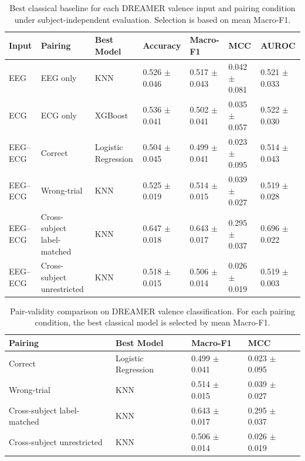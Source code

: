 \begin{table}[!t]
\centering
\caption{Best classical baseline for each DREAMER valence input and pairing condition under subject-independent evaluation. Selection is based on mean Macro-F1.}
\label{tab:dreamer_valence_best_classical}
\begin{tabular}{lllllll}
\toprule
Input & Pairing & Best Model & Accuracy & Macro-F1 & MCC & AUROC \\
\midrule
EEG & EEG only & KNN & 0.526 $\pm$ 0.046 & 0.517 $\pm$ 0.043 & 0.042 $\pm$ 0.081 & 0.521 $\pm$ 0.033 \\
ECG & ECG only & XGBoost & 0.536 $\pm$ 0.041 & 0.502 $\pm$ 0.041 & 0.035 $\pm$ 0.057 & 0.522 $\pm$ 0.030 \\
EEG--ECG & Correct & Logistic Regression & 0.504 $\pm$ 0.045 & 0.499 $\pm$ 0.041 & 0.023 $\pm$ 0.095 & 0.514 $\pm$ 0.043 \\
EEG--ECG & Wrong-trial & KNN & 0.525 $\pm$ 0.019 & 0.514 $\pm$ 0.015 & 0.039 $\pm$ 0.027 & 0.519 $\pm$ 0.028 \\
EEG--ECG & Cross-subject label-matched & KNN & 0.647 $\pm$ 0.018 & 0.643 $\pm$ 0.017 & 0.295 $\pm$ 0.037 & 0.696 $\pm$ 0.022 \\
EEG--ECG & Cross-subject unrestricted & KNN & 0.518 $\pm$ 0.015 & 0.506 $\pm$ 0.014 & 0.026 $\pm$ 0.019 & 0.519 $\pm$ 0.003 \\
\bottomrule
\end{tabular}
\end{table}

\begin{table}[!t]
\centering
\caption{Pair-validity comparison on DREAMER valence classification. For each pairing condition, the best classical model is selected by mean Macro-F1.}
\label{tab:dreamer_valence_pair_validity}
\begin{tabular}{llll}
\toprule
Pairing & Best Model & Macro-F1 & MCC \\
\midrule
Correct & Logistic Regression & 0.499 $\pm$ 0.041 & 0.023 $\pm$ 0.095 \\
Wrong-trial & KNN & 0.514 $\pm$ 0.015 & 0.039 $\pm$ 0.027 \\
Cross-subject label-matched & KNN & 0.643 $\pm$ 0.017 & 0.295 $\pm$ 0.037 \\
Cross-subject unrestricted & KNN & 0.506 $\pm$ 0.014 & 0.026 $\pm$ 0.019 \\
\bottomrule
\end{tabular}
\end{table}

